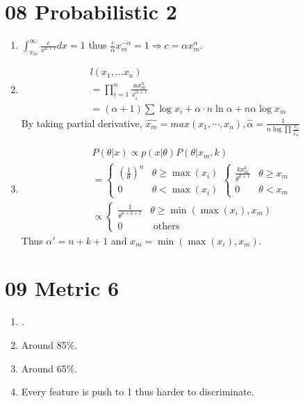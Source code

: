 \documentclass[10pt, oneside]{article}
\begin{document}
\section{08 Probabilistic 2}
\begin{enumerate}
	\item $\int_{x_{m}}^{\infty} \frac{c}{x^{a+1}} d x=1$ thus $\frac{c}{\alpha} x_{m}^{-\alpha}=1 \Rightarrow c=\alpha x_{m}^{\alpha}$.
	\item $$
	\begin{array}{l}
	l\left(x_{1}, \ldots x_{n}\right) \\
	=\prod_{i=1}^n \frac{\alpha x_{m}^{\alpha}}{x_{i}^{\alpha+1}} \\
	=(\alpha+1)\sum \log x_{i}+\alpha \cdot n \ln \alpha+n \alpha \log x_{m}
	\end{array}
	$$
	By taking partial derivative, $\hat{x_m}=max(x_1,\cdots,x_n), \hat{\alpha}=\frac{1}{n\log\prod\frac{x_i}{\hat{x_m}}}$
	\item $$
	\begin{aligned}
	&P(\theta | x) \propto p(x | \theta) P\left(\theta | x_{m}, k\right)\\
	&=\left\{\begin{array}{cl}
	\left(\frac{1}{\theta}\right)^{n} & \theta \geqslant \max \left(x_{i}\right) \\
	0 & \theta<\max \left(x_{i}\right)
	\end{array}\left\{\begin{array}{ll}
	\frac{k x_{m}^{k}}{\theta^{k+1}} & \theta \geqslant x_{m} \\
	0 & \theta<x_{m}
	\end{array}\right.\right.\\
	&\propto \left\{\begin{array}{ll}
	\frac{1}{\theta^{n+k+1}} & \theta \geqslant \min \left(\max (x_i), x_{m}\right) \\
	0 & \text { others }
	\end{array}\right.
	\end{aligned}
	$$
	Thus $\alpha'=n+k+1$ and $x_m=\min \left(\max (x_i), x_{m}\right)$.
\end{enumerate}
\section{09 Metric 6}
\begin{enumerate}
	\item .
	\item Around 85$\%$.
	\item Around 65$\%$.
	\item Every feature is push to 1 thus harder to discriminate. 
\end{enumerate}
\end{document}
